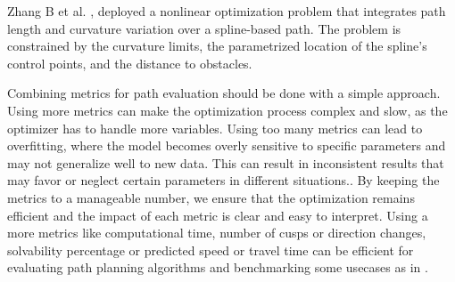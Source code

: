 Zhang B et al. \cite{R36}, deployed a nonlinear optimization problem that integrates path length and 
curvature variation over a spline-based path. The problem is constrained by the curvature limits, the 
parametrized location of the spline's control points, and the distance to obstacles.

Combining metrics for path evaluation should be done with a simple approach. Using more metrics can make 
the optimization process complex 
and slow, as the optimizer has to handle more variables. Using too many metrics can lead to overfitting, 
where the model becomes overly sensitive to specific parameters and may not generalize well to new data. 
This can result in inconsistent results that may favor or neglect certain parameters in different situations.. 
By keeping the metrics to a 
manageable number, we ensure that the optimization remains efficient and the impact of each metric 
is clear and easy to interpret. 
Using a more metrics like computational time, number of cusps or direction changes, solvability percentage
or predicted speed or travel time can be efficient for evaluating path planning algorithms and benchmarking some
usecases as in \cite{R23}.


